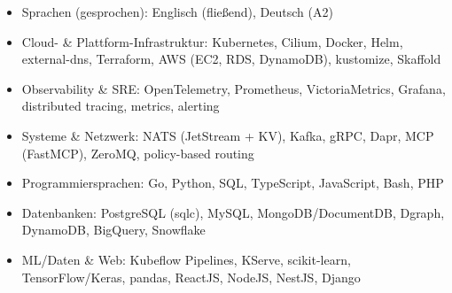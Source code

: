 \documentclass[10pt,a4paper]{resume}
\begin{document}
\begin{itemize}[leftmargin=1.4em,nosep,topsep=2pt]
  \item Sprachen (gesprochen): Englisch (fließend), Deutsch (A2)
  \item Cloud- \& Plattform-Infrastruktur: Kubernetes, Cilium, Docker, Helm, external-dns, Terraform, AWS (EC2, RDS, DynamoDB), kustomize, Skaffold
  \item Observability \& SRE: OpenTelemetry, Prometheus, VictoriaMetrics, Grafana, distributed tracing, metrics, alerting
  \item Systeme \& Netzwerk: NATS (JetStream + KV), Kafka, gRPC, Dapr, MCP (FastMCP), ZeroMQ, policy-based routing
  \item Programmiersprachen: Go, Python, SQL, TypeScript, JavaScript, Bash, PHP
  \item Datenbanken: PostgreSQL (sqlc), MySQL, MongoDB/DocumentDB, Dgraph, DynamoDB, BigQuery, Snowflake
  \item ML/Daten \& Web: Kubeflow Pipelines, KServe, scikit-learn, TensorFlow/Keras, pandas, ReactJS, NodeJS, NestJS, Django
\end{itemize}
\end{document}

